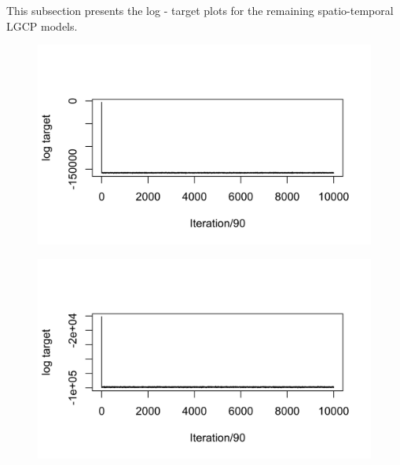 \documentclass[12pt,a4paper]{report}
\begin{document}
This subsection presents the log - target plots for the remaining spatio-temporal LGCP models. 

\begin{figure}[H]
\begin{center}
\includegraphics{Log Target Plot - ST - Major 0.png}
\end{center}
\end{figure}

\begin{figure}[H]
\begin{center}
\includegraphics{Log Target Plot - ST - Major 2.png}
\end{center}
\end{figure}
\end{document}
